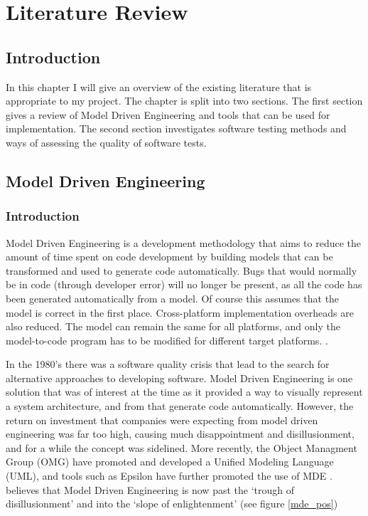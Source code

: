 \chapter{Literature Review}

\section{Introduction}
In this chapter I will give an overview of the existing literature that is appropriate to my project. The chapter is split into two sections. The first section gives a review of Model Driven Engineering and tools that can be used for implementation. The second section investigates software testing methods and ways of assessing the quality of software tests.

\section{Model Driven Engineering}

\subsection{Introduction}
Model Driven Engineering is a development methodology that aims to reduce the amount of time spent on code development by building models that can be transformed and used to generate code automatically. Bugs that would normally be in code (through developer error) will no longer be present, as all the code has been generated automatically from a model. Of course this assumes that the model is correct in the first place. Cross-platform implementation overheads are also reduced. The model can remain the same for all platforms, and only the model-to-code program has to be modified for different target platforms. \citep{mdseLano}.

In the 1980's there was a software quality crisis that lead to the search for alternative approaches to developing software. Model Driven Engineering is one solution that was of interest at the time as it provided a way to visually represent a system architecture, and from that generate code automatically. However, the return on investment that companies were expecting from model driven engineering was far too high, causing much disappointment and disillusionment, and for a while the concept was sidelined. More recently, the Object Managment Group (OMG) have promoted and developed a Unified Modeling Language (UML), and tools such as Epsilon have further promoted the use of MDE \citep{mdeHistory}.  \citet{brambillaBook} believes that Model Driven Engineering is now past the `trough of disillusionment' and into the `slope of enlightenment' (see figure \ref{mde_pos}) \\

